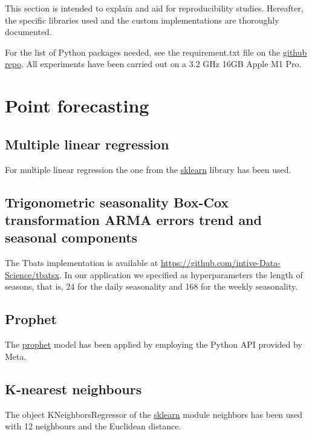 This section is intended to explain and aid for reproducibility studies. Hereafter, the specific libraries used and the custom implementations are thoroughly documented.

For the list of Python packages needed, see the requirement.txt file on the \href{https://github.com/luca-pernigo/ThesisKernelMethods}{github repo}.
All experiments have been carried out on a 3.2 GHz 16GB Apple M1 Pro.







\section{Point forecasting}
\subsection{Multiple linear regression}
For multiple linear regression the one from the \href{https://scikit-learn.org/stable/}{sklearn} library has been used.

\subsection{Trigonometric seasonality Box-Cox transformation AR\-MA errors trend and seasonal components}
The Tbats implementation is available at \href{https://github.com/intive-DataScience/tbats}{https://github.com/intive-Data-Science/tbatsx}.
In our application we specified as hyperparameters the length of seasons, that is, 24 for the daily seasonality and 168 for the weekly seasonality.

\subsection{Prophet}
The \href{https://facebook.github.io/prophet/docs/quick_start.html}{prophet} model has been applied by employing the Python API provided by Meta.

\subsection{K-nearest neighbours}
The object KNeighborsRegressor of the \href{https://scikit-learn.org/stable/}{sklearn} module neighbors has been used with 12 neighbours and the Euclidean distance.


